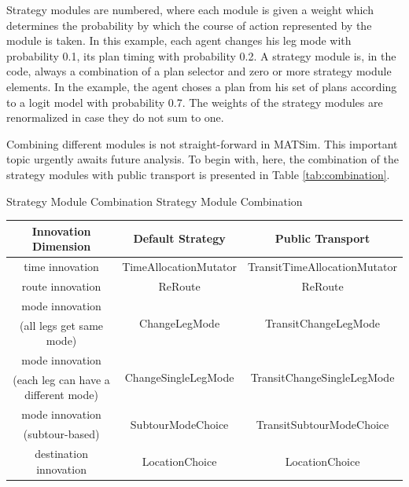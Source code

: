 Strategy modules are numbered, where each module is given a weight which determines the probability by which the course of action represented by the module is taken. In this example, each agent changes his leg mode with probability 0.1, its plan timing with probability 0.2. A strategy module is, in the code, always a combination of a plan selector and zero or more strategy module elements. In the example, the agent choses a plan from his set of plans according to a logit model with probability 0.7. The weights of the strategy modules are renormalized in case they do not sum to one.

Combining different modules is not straight-forward in MATSim. This important topic urgently awaits future analysis. To begin with, here, the combination of the strategy modules with public transport is presented in Table \ref{tab:combination}.

\createtable%
{Strategy Module Combination}%
{Strategy Module Combination}%
{\label{tab:combination}}%
{%
  \begin{tabular}[c]{|c|c|c|}
   \hline
\textbf{Innovation Dimension}	& \textbf{Default Strategy} & \textbf{Public Transport}\\
\hline
time innovation & TimeAllocationMutator &  TransitTimeAllocationMutator\\
\hline
route innovation & ReRoute & ReRoute \\
\hline
mode innovation & \multirow{2}{*}{ChangeLegMode} & \multirow{2}{*}{TransitChangeLegMode} \\
(all legs get same mode) &  &  \\
\hline
mode innovation & \multirow{2}{*}{ChangeSingleLegMode} & \multirow{2}{*}{TransitChangeSingleLegMode} \\
(each leg can have a different mode) &  &  \\
\hline
mode innovation & \multirow{2}{*}{SubtourModeChoice} & \multirow{2}{*}{TransitSubtourModeChoice} \\
(subtour-based) &  &  \\
\hline
destination innovation & LocationChoice & LocationChoice \\
\hline
  \end{tabular}
}%
{}


